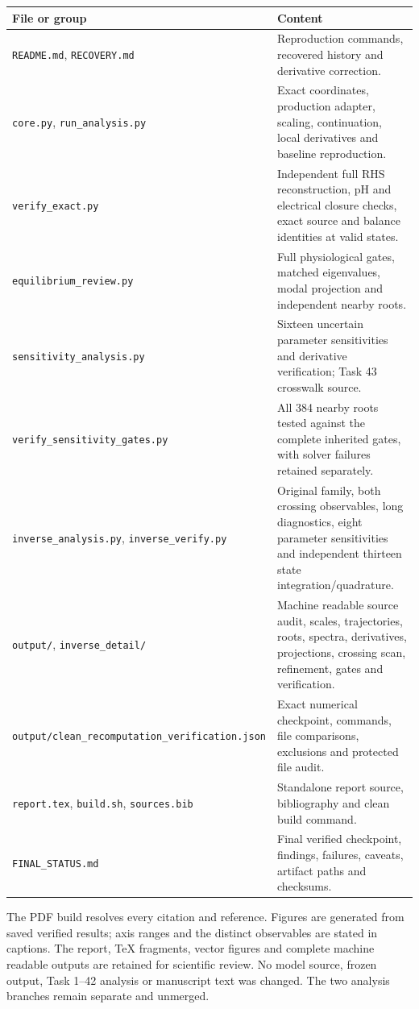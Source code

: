 \documentclass[11pt,a4paper]{article}
\begin{document}
\begin{longtable}{>{\raggedright\arraybackslash}p{.42\linewidth}>{\raggedright\arraybackslash}p{.51\linewidth}}
\toprule
File or group & Content\\\midrule\endhead
\texttt{README.md}, \texttt{RECOVERY.md} & Reproduction commands, recovered
history and derivative correction.\\
\texttt{core.py}, \texttt{run\_analysis.py} & Exact coordinates, production
adapter, scaling, continuation, local derivatives and baseline reproduction.\\
\texttt{verify\_exact.py} & Independent full RHS reconstruction, pH and
electrical closure checks, exact source and balance identities at valid states.\\
\texttt{equilibrium\_review.py} & Full physiological gates, matched
eigenvalues, modal projection and independent nearby roots.\\
\texttt{sensitivity\_analysis.py} & Sixteen uncertain parameter sensitivities
and derivative verification; Task 43 crosswalk source.\\
\texttt{verify\_sensitivity\_gates.py} & All 384 nearby roots tested against
the complete inherited gates, with solver failures retained separately.\\
\texttt{inverse\_analysis.py}, \texttt{inverse\_verify.py} & Original family,
both crossing observables, long diagnostics, eight parameter sensitivities
and independent thirteen state integration/quadrature.\\
\texttt{output/}, \texttt{inverse\_detail/} & Machine readable source audit,
scales, trajectories, roots, spectra, derivatives, projections, crossing scan,
refinement, gates and verification.\\
\nolinkurl{output/clean_recomputation_verification.json} & Exact numerical
checkpoint, commands, file comparisons, exclusions and protected file audit.\\
\texttt{report.tex}, \texttt{build.sh}, \texttt{sources.bib} & Standalone
report source, bibliography and clean build command.\\
\texttt{FINAL\_STATUS.md} & Final verified checkpoint, findings, failures,
caveats, artifact paths and checksums.\\\bottomrule
\end{longtable}

The PDF build resolves every citation and reference. Figures are generated
from saved verified results; axis ranges and the distinct observables are
stated in captions. The report, TeX fragments, vector figures and complete
machine readable outputs are retained for scientific review. No model
source, frozen output, Task 1--42 analysis or manuscript text was changed.
The two analysis branches remain separate and unmerged.



\end{document}
